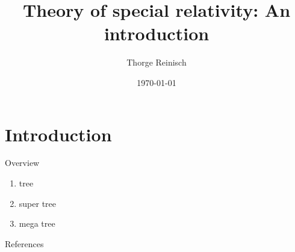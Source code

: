\documentclass[aspectratio=169,
							12pt,
							titlepage,
							bibliography=totoc,
							xcolor=dvipsnames,
							]{beamer}
\begin{document}
	\title{Theory of special relativity: An introduction} 
	\author{Thorge Reinisch} 
	\date{\today} 
	
	\frame{\titlepage}
	
	
	\section{Introduction}

    \begin{frame}{Overview}
        \begin{enumerate}
            \setlength{\itemsep}{20pt}
            \item tree
            \item super tree
            \item mega tree
        \end{enumerate}
	\end{frame}
	
	\begin{frame}[allowframebreaks]{References}
		\footnotesize
		\printbibliography
	\end{frame}
	
\end{document}
